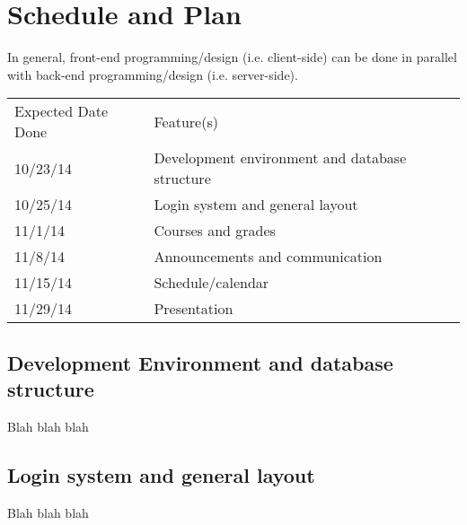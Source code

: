 \documentclass{article}
\begin{document}
\section{Schedule and Plan}

In general, front-end programming/design (i.e. client-side) can be done in
parallel with back-end programming/design (i.e. server-side).

\vspace{10 pt}

\begin{tabular}{ll}
    Expected Date Done&Feature(s)\\
    10/23/14&Development environment and database structure\\
    10/25/14&Login system and general layout\\
    11/1/14&Courses and grades\\
    11/8/14&Announcements and communication\\
    11/15/14&Schedule/calendar\\
    11/29/14&Presentation\\
\end{tabular}

\subsection{Development Environment and database structure}

Blah blah blah

\subsection{Login system and general layout}

Blah blah blah



{}

\end{document}
